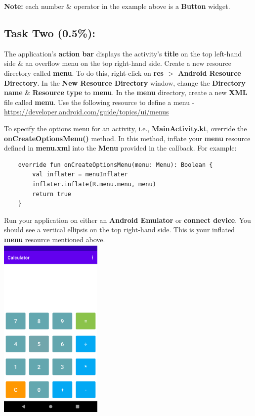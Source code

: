 \documentclass{article}
\begin{document}
\textbf{Note:} each number \& operator in the example above is a \textbf{Button} widget.

\subsection*{Task Two (0.5\%):} 
The application's \textbf{action bar} displays the activity's \textbf{title} on the top left-hand side \& an overflow menu on the top right-hand side. Create a new resource directory called \textbf{menu}. To do this, right-click on \textbf{res $>$ Android Resource Directory}. In the \textbf{New Resource Directory} window, change the \textbf{Directory name} \& \textbf{Resource type} to \textbf{menu}. In the \textbf{menu} directory, create a new \textbf{XML} file called \textbf{menu}. Use the following resource to define a menu - \href{https://developer.android.com/guide/topics/ui/menus}{https://developer.android.com/guide/topics/ui/menus}

To specify the options menu for an activity, i.e., \textbf{MainActivity.kt}, override the \textbf{onCreateOptionsMenu()} method. In this method, inflate your \textbf{menu} resource defined in \textbf{menu.xml} into the \textbf{Menu} provided in the callback. For example:

\begin{verbatim}
    override fun onCreateOptionsMenu(menu: Menu): Boolean {
        val inflater = menuInflater
        inflater.inflate(R.menu.menu, menu)
        return true
    }
\end{verbatim}

Run your application on either an \textbf{Android Emulator} or \textbf{connect device}. You should see a vertical ellipsis on the top right-hand side. This is your inflated \textbf{menu} resource mentioned above. \\

\includegraphics[width=5cm, height=9cm]{../tex/img/practicals/02-calculator-2.png}
\end{document}
